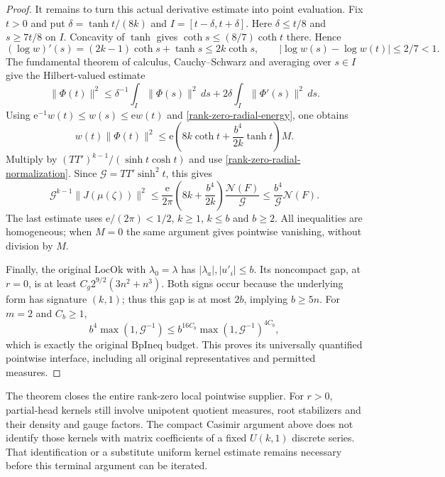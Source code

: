 \begin{proof}
It remains to turn this actual derivative estimate into point
evaluation.  Fix $t>0$ and put
$\delta=\tanh t/(8k)$ and $I=[t-\delta,t+\delta]$.
Here $\delta\le t/8$ and $s\ge7t/8$ on $I$.  Concavity of
$\tanh$ gives $\coth s\le(8/7)\coth t$ there.  Hence
\[
 (\log w)'(s)=(2k-1)\coth s+\tanh s\le2k\coth s,
 \qquad |\log w(s)-\log w(t)|\le2/7<1.
\]
The fundamental theorem of calculus, Cauchy--Schwarz and
averaging over $s\in I$ give the Hilbert-valued estimate
\[
 \|\Phi(t)\|^2\le\delta^{-1}\int_I\|\Phi(s)\|^2\,ds
                       +2\delta\int_I\|\Phi'(s)\|^2\,ds.
\]
Using $\mathrm e^{-1}w(t)\le w(s)\le\mathrm e w(t)$ and
\eqref{rank-zero-radial-energy}, one obtains
\[
 w(t)\|\Phi(t)\|^2
       \le\mathrm e\left(8k\coth t+\frac{b^4}{2k}\tanh t\right)M.
\]
Multiply by $(TT')^{k-1}/(\sinh t\cosh t)$ and use
\eqref{rank-zero-radial-normalization}.  Since
$\mathcal G=TT'\sinh^2t$, this gives
\[
 \mathcal G^{k-1}\|J(\mu(\zeta))\|^2
 \le \frac{\mathrm e}{2\pi}
           \left(8k+\frac{b^4}{2k}\right)
            \frac{\mathcal N(F)}{\mathcal G}
 \le \frac{b^4}{\mathcal G}\mathcal N(F).
\]
The last estimate uses $\mathrm e/(2\pi)<1/2$, $k\ge1$, $k\le b$ and
$b\ge2$.  All inequalities are homogeneous; when $M=0$ the
same argument gives pointwise vanishing, without division by $M$.

Finally, the original $\mathrm{LocOk}$ with $\lambda_0=\lambda$
has $|\lambda_a|,|u'_i|\le b$.  Its noncompact gap, at $r=0$,
is at least $C_g2^{9/2}(3n^2+n^3)$.  Both signs occur because
the underlying form has signature $(k,1)$; thus this gap is at
most $2b$, implying $b\ge5n$.  For $m=2$ and $C_b\ge1$,
\[
 b^4\max(1,\mathcal G^{-1})
 \le b^{16C_b}\max(1,\mathcal G^{-1})^{4C_b},
\]
which is exactly the original $\mathrm{BpIneq}$ budget.
This proves its universally quantified pointwise interface,
including all original representatives and permitted measures.
\end{proof}

The theorem closes the entire rank-zero local pointwise supplier.
For $r>0$, partial-head kernels still involve unipotent quotient
measures, root stabilizers and their density and gauge factors.
The compact Casimir argument above does not identify those kernels
with matrix coefficients of a fixed $U(k,1)$ discrete series.
That identification or a substitute uniform kernel estimate remains
necessary before this terminal argument can be iterated.
